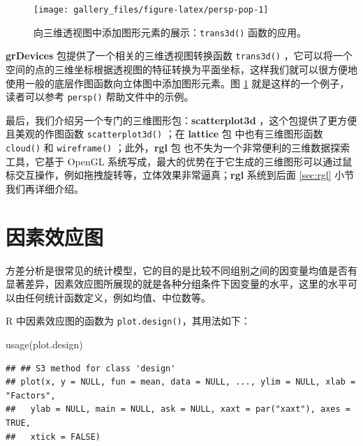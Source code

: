 \documentclass[
  b5paper,
  UTF8,twoside]{book}
\newenvironment{Shaded}{\begin{snugshade}}{\end{snugshade}}
\newcommand{\FunctionTok}[1]{\textcolor[rgb]{0.00,0.00,0.00}{#1}}
\newcommand{\NormalTok}[1]{#1}
\begin{document}
\begin{figure}

{\centering \texttt{[image: gallery\_files/figure-latex/persp-pop-1]} 

}

\caption[向三维透视图中添加图形元素的展示]{向三维透视图中添加图形元素的展示：\texttt{trans3d()} 函数的应用。}\label{fig:persp-pop}
\end{figure}

\textbf{grDevices} 包提供了一个相关的三维透视图转换函数 \texttt{trans3d()} ，它可以将一个空间的点的三维坐标根据透视图的特征转换为平面坐标，这样我们就可以很方便地使用一般的底层作图函数向立体图中添加图形元素。图 \ref{fig:persp-pop}
就是这样的一个例子，读者可以参考 \texttt{persp()} 帮助文件中的示例。

最后，我们介绍另一个专门的三维图形包：\textbf{scatterplot3d}
\citep{Ligges03}，这个包提供了更方便且美观的作图函数 \texttt{scatterplot3d()} ；在 \textbf{lattice} 包 \citep{Sarkar08} 中也有三维图形函数 \texttt{cloud()} 和 \texttt{wireframe()} ；此外，\textbf{rgl} 包 \citep{rgl} 也不失为一个非常便利的三维数据探索工具，它基于 OpenGL 系统写成，最大的优势在于它生成的三维图形可以通过鼠标交互操作，例如拖拽旋转等，立体效果非常逼真；\textbf{rgl} 系统到后面 \ref{sec:rgl} 小节我们再详细介绍。

\hypertarget{plot-design}{%
\section{因素效应图}\label{plot-design}}

方差分析是很常见的统计模型，它的目的是比较不同组别之间的因变量均值是否有显著差异，因素效应图所展现的就是各种分组条件下因变量的水平，这里的水平可以由任何统计函数定义，例如均值、中位数等。

R 中因素效应图的函数为 \texttt{plot.design()}，其用法如下：

\begin{Shaded}
\begin{Highlighting}[]
\FunctionTok{usage}\NormalTok{(plot.design)}
\end{Highlighting}
\end{Shaded}

\begin{verbatim}
## ## S3 method for class 'design'
## plot(x, y = NULL, fun = mean, data = NULL, ..., ylim = NULL, xlab = "Factors",
##   ylab = NULL, main = NULL, ask = NULL, xaxt = par("xaxt"), axes = TRUE,
##   xtick = FALSE)
\end{verbatim}
\end{document}
